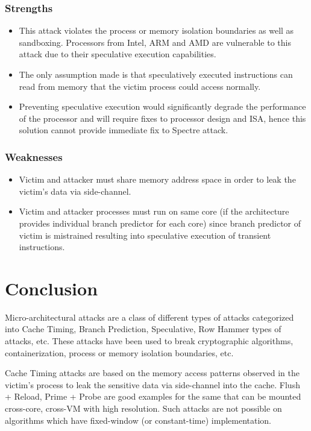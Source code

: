 \documentclass[a4paper,12pt, final]{report}
\begin{document}
\subsection{Strengths}
\begin{itemize}
    \item This attack violates the process or memory isolation boundaries as well as sandboxing. Processors from Intel, ARM and AMD are vulnerable to this attack due to their speculative execution capabilities.
    \item The only assumption made is that speculatively executed instructions can read from memory that the victim process could access normally.
    \item Preventing speculative execution would significantly degrade the performance of the processor and will require fixes to processor design and ISA, hence this solution cannot provide immediate fix to Spectre attack.
\end{itemize}

\subsection{Weaknesses}
\begin{itemize}
    \item Victim and attacker must share memory address space in order to leak the victim's data via side-channel.
    \item Victim and attacker processes must run on same core (if the architecture provides individual branch predictor for each core) since branch predictor of victim is mistrained resulting into speculative execution of transient instructions.
\end{itemize}


\chapter{Conclusion}
Micro-architectural attacks are a class of different types of attacks categorized into Cache Timing, Branch Prediction, Speculative, Row Hammer types of attacks, etc. These attacks have been used to break cryptographic algorithms, containerization, process or memory isolation boundaries, etc.

Cache Timing attacks are based on the memory access patterns observed in the victim's process to leak the sensitive data via side-channel into the cache. Flush + Reload, Prime + Probe are good examples for the same that can be mounted cross-core, cross-VM with high resolution. Such attacks are not possible on algorithms which have fixed-window (or constant-time) implementation.
\end{document}
